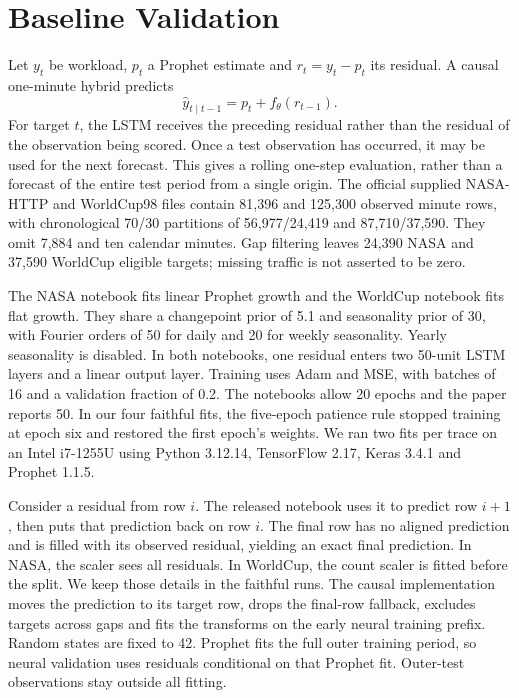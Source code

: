 \documentclass[10pt,twocolumn,a4paper]{article}
\begin{document}
\section{Baseline Validation}
Let $y_t$ be workload, $p_t$ a Prophet estimate and $r_t=y_t-p_t$ its residual. A causal one-minute hybrid predicts
\begin{equation}\widehat y_{t\mid t-1}=p_t+f_\theta(r_{t-1}).\end{equation}
For target $t$, the LSTM receives the preceding residual rather than the residual of the observation being scored. Once a test observation has occurred, it may be used for the next forecast. This gives a rolling one-step evaluation, rather than a forecast of the entire test period from a single origin. The official supplied NASA-HTTP and WorldCup98 files contain 81,396 and 125,300 observed minute rows, with chronological 70/30 partitions of 56,977/24,419 and 87,710/37,590. They omit 7,884 and ten calendar minutes. Gap filtering leaves 24,390 NASA and 37,590 WorldCup eligible targets; missing traffic is not asserted to be zero.

The NASA notebook fits linear Prophet growth and the WorldCup notebook fits flat growth. They share a changepoint prior of 5.1 and seasonality prior of 30, with Fourier orders of 50 for daily and 20 for weekly seasonality. Yearly seasonality is disabled. In both notebooks, one residual enters two 50-unit LSTM layers and a linear output layer. Training uses Adam and MSE, with batches of 16 and a validation fraction of 0.2. The notebooks allow 20 epochs and the paper reports 50. In our four faithful fits, the five-epoch patience rule stopped training at epoch six and restored the first epoch's weights. We ran two fits per trace on an Intel i7-1255U using Python 3.12.14, TensorFlow 2.17, Keras 3.4.1 and Prophet 1.1.5.

Consider a residual from row $i$. The released notebook uses it to predict row $i+1$, then puts that prediction back on row $i$. The final row has no aligned prediction and is filled with its observed residual, yielding an exact final prediction. In NASA, the scaler sees all residuals. In WorldCup, the count scaler is fitted before the split. We keep those details in the faithful runs. The causal implementation moves the prediction to its target row, drops the final-row fallback, excludes targets across gaps and fits the transforms on the early neural training prefix. Random states are fixed to 42. Prophet fits the full outer training period, so neural validation uses residuals conditional on that Prophet fit. Outer-test observations stay outside all fitting.
\end{document}
